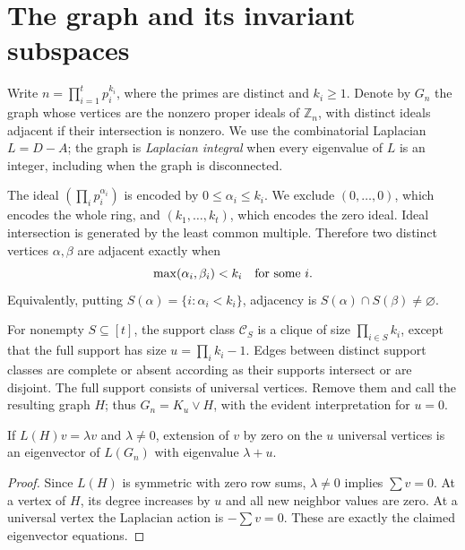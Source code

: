 \section{The graph and its invariant subspaces}
\label{sec:graph}

Write $n=\prod_{i=1}^t p_i^{k_i}$, where the primes are distinct and
$k_i\geq1$. Denote by $G_n$ the graph whose vertices are the nonzero
proper ideals of $\mathbb Z_n$, with distinct ideals adjacent if their
intersection is nonzero. We use the combinatorial Laplacian $L=D-A$;
the graph is \emph{Laplacian integral} when every eigenvalue of $L$ is an
integer, including when the graph is disconnected.

The ideal $(\prod_i p_i^{\alpha_i})$ is encoded by
$0\leq\alpha_i\leq k_i$. We exclude $(0,\ldots,0)$, which encodes the
whole ring, and $(k_1,\ldots,k_t)$, which encodes the zero ideal.
Ideal intersection is generated by the least common multiple. Therefore
two distinct vertices $\alpha,\beta$ are adjacent exactly when
\[
\max(\alpha_i,\beta_i)<k_i\quad\hbox{for some }i.
\]
Equivalently, putting $S(\alpha)=\{i:\alpha_i<k_i\}$, adjacency is
$S(\alpha)\cap S(\beta)\ne\varnothing$.

For nonempty $S\subseteq[t]$, the support class $\mathcal C_S$ is a
clique of size $\prod_{i\in S}k_i$, except that the full support has
size $u=\prod_i k_i-1$. Edges between distinct support classes are complete
or absent according as their supports intersect or are disjoint. The full
support consists of universal vertices. Remove them and call the resulting
graph $H$; thus $G_n=K_u\vee H$, with the evident interpretation for $u=0$.

\begin{lemma}
\label{lem:join}
If $L(H)v=\lambda v$ and $\lambda\ne0$, extension of $v$ by zero on
the $u$ universal vertices is an eigenvector of $L(G_n)$ with eigenvalue
$\lambda+u$.
\end{lemma}
\begin{proof}
Since $L(H)$ is symmetric with zero row sums, $\lambda\ne0$ implies
$\sum v=0$. At a vertex of $H$, its degree increases by $u$ and all
new neighbor values are zero. At a universal vertex the Laplacian action
is $-\sum v=0$. These are exactly the claimed eigenvector equations.
\end{proof}

